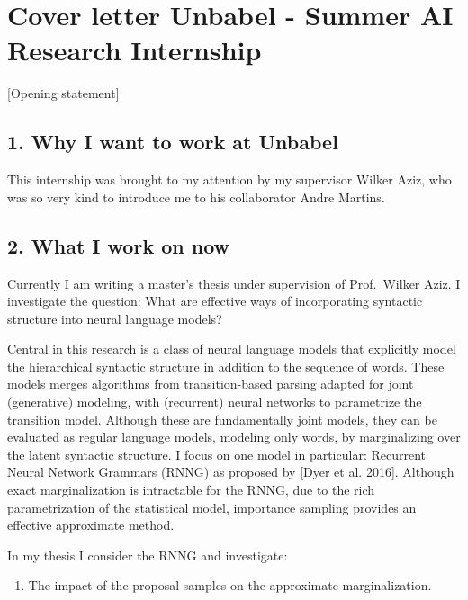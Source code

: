 \documentclass[]{article}
\date{}
\providecommand{\tightlist}{%
  \setlength{\itemsep}{0pt}\setlength{\parskip}{0pt}}
\begin{document}
\section{Cover letter Unbabel - Summer AI Research
Internship}\label{cover-letter-unbabel---summer-ai-research-internship}

{[}Opening statement{]}

\subsection{1. Why I want to work at
Unbabel}\label{why-i-want-to-work-at-unbabel}

This internship was brought to my attention by my supervisor Wilker
Aziz, who was so very kind to introduce me to his collaborator Andre
Martins.

\subsection{2. What I work on now}\label{what-i-work-on-now}

Currently I am writing a master's thesis under supervision of
Prof.~Wilker Aziz. I investigate the question: What are effective ways
of incorporating syntactic structure into neural language models?

Central in this research is a class of neural language models that
explicitly model the hierarchical syntactic structure in addition to the
sequence of words. These models merges algorithms from transition-based
parsing adapted for joint (generative) modeling, with (recurrent) neural
networks to parametrize the transition model. Although these are
fundamentally joint models, they can be evaluated as regular language
models, modeling only words, by marginalizing over the latent syntactic
structure. I focus on one model in particular: Recurrent Neural Network
Grammars (RNNG) as proposed by {[}Dyer et al. 2016{]}. Although exact
marginalization is intractable for the RNNG, due to the rich
parametrization of the statistical model, importance sampling provides
an effective approximate method.

In my thesis I consider the RNNG and investigate:

\begin{enumerate}
\def\labelenumi{\arabic{enumi}.}
\tightlist
\item
  The impact of the proposal samples on the approximate marginalization.
\end{enumerate}
\end{document}
